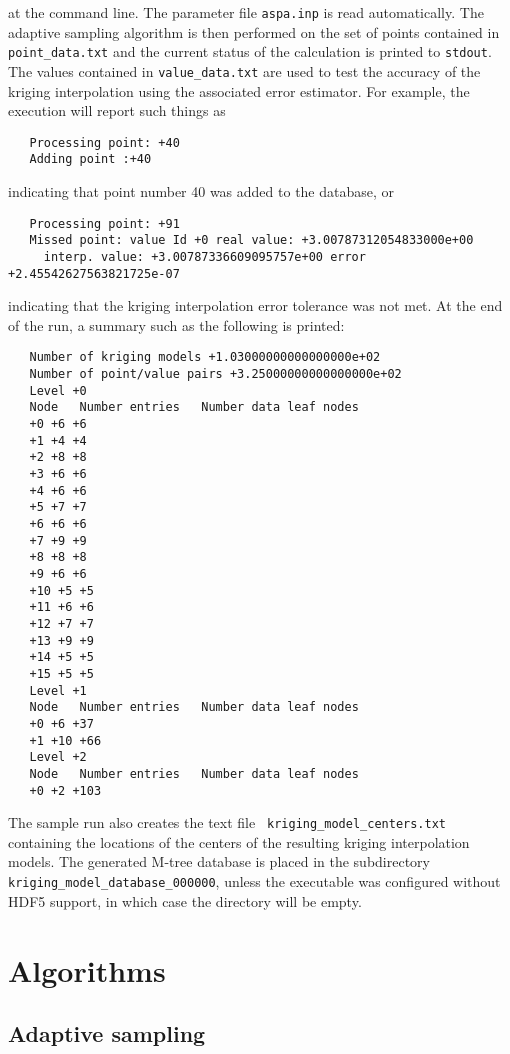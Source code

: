 \documentclass[12pt]{article}
\begin{document}
\noindent at the command line.  The parameter file {\tt aspa.inp} is
read automatically.  The adaptive sampling algorithm is then performed
on the set of points contained in {\tt point\_data.txt} and the
current status of the calculation is printed to {\tt stdout}.  The
values contained in {\tt value\_data.txt} are used to test the
accuracy of the kriging interpolation using the associated error
estimator.  For example, the execution will report such things as
\begin{verbatim}
   Processing point: +40
   Adding point :+40
\end{verbatim}
indicating that point number 40 was added to the database, or
\begin{verbatim}
   Processing point: +91
   Missed point: value Id +0 real value: +3.00787312054833000e+00 
     interp. value: +3.00787336609095757e+00 error +2.45542627563821725e-07
\end{verbatim}
indicating that the kriging interpolation error tolerance was not
met.  At the end of the run, a summary such as the following is
printed:
\begin{verbatim}
   Number of kriging models +1.03000000000000000e+02
   Number of point/value pairs +3.25000000000000000e+02
   Level +0
   Node   Number entries   Number data leaf nodes
   +0 +6 +6 
   +1 +4 +4 
   +2 +8 +8 
   +3 +6 +6 
   +4 +6 +6 
   +5 +7 +7 
   +6 +6 +6 
   +7 +9 +9 
   +8 +8 +8 
   +9 +6 +6 
   +10 +5 +5 
   +11 +6 +6 
   +12 +7 +7 
   +13 +9 +9 
   +14 +5 +5 
   +15 +5 +5 
   Level +1
   Node   Number entries   Number data leaf nodes
   +0 +6 +37 
   +1 +10 +66 
   Level +2
   Node   Number entries   Number data leaf nodes
   +0 +2 +103 
\end{verbatim}

\noindent The sample run also creates the text file {\tt
  kriging\_model\_centers.txt} containing the locations of the centers
of the resulting kriging interpolation models.  The generated M-tree
database is placed in the subdirectory {\tt
  kriging\_model\_database\_000000}, unless the executable was configured
without HDF5 support, in which case the directory will be empty.

\section{Algorithms}

\subsection{Adaptive sampling}
\end{document}
